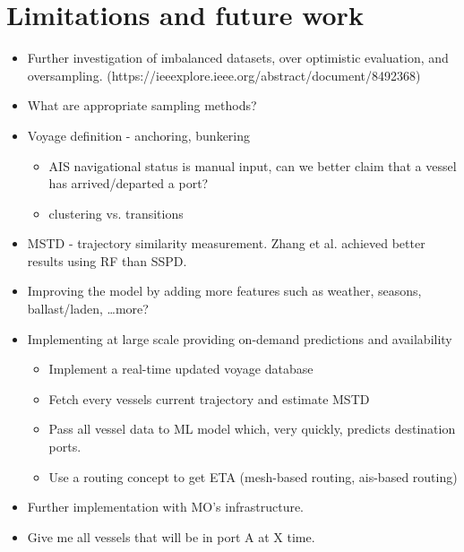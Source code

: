 \section{Limitations and future work}

\begin{itemize}
    \item Further investigation of imbalanced datasets, over optimistic evaluation, and oversampling. (https://ieeexplore.ieee.org/abstract/document/8492368)
    \item What are appropriate sampling methods?
\end{itemize}

\begin{itemize}
    \item Voyage definition - anchoring, bunkering
\begin{itemize}
    \item AIS navigational status is manual input, can we better claim that a vessel has arrived/departed a port?
    \item clustering vs. transitions
\end{itemize}
    \item MSTD - trajectory similarity measurement. Zhang et al. achieved better results using RF than SSPD.
    \item Improving the model by adding more features such as weather, seasons, ballast/laden, \ldots more?
    \item Implementing at large scale providing on-demand predictions and availability
\begin{itemize}
    \item Implement a real-time updated voyage database
    \item Fetch every vessels current trajectory and estimate MSTD
    \item Pass all vessel data to ML model which, very quickly, predicts destination ports.
    \item Use a routing concept to get ETA (mesh-based routing, ais-based routing)
\end{itemize}
\end{itemize}

\begin{itemize}
    \item Further implementation with MO's infrastructure.
    \item Give me all vessels that will be in port A at X time.
\end{itemize}
